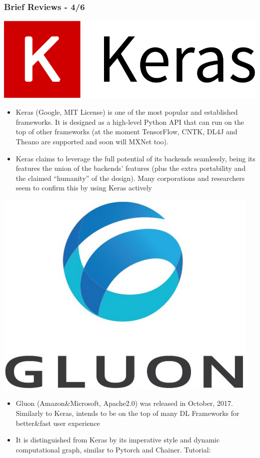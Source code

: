 \documentclass[hyperref={pdfpagelabels=false}]{beamer}
\begin{document}
    
     \begin{frame}
       \frametitle{Brief Reviews - 4/6}
       \centering
       \includegraphics[scale=0.07]{logo_keras.png}
       \begin{itemize}[<.->]
       \item \small{Keras (Google, MIT License) is one of the most popular and established frameworks. It is designed as a high-level Python API that can run on the top of other frameworks (at the moment TensorFlow, CNTK, DL4J and Theano are supported and soon will MXNet too\cite{keras-web})}.
       \item \small{Keras claims to leverage the full potential of its backends seamlessly, being its features the union of the backends' features (plus the extra portability and the claimed ``humanity'' of the design). Many corporations and researchers seem to confirm this by using Keras actively}
       \end{itemize}

       \vspace{0mm}
       \centering
       \includegraphics[scale=0.07]{logo_gluon.png}
       \begin{itemize}[<.->]
       \item \small{Gluon (Amazon\&Microsoft, Apache2.0) was released in October, 2017. Similarly to Keras, intends to be on the top of many DL Frameworks for better\&fast user experience}
       \item \small{It is distinguished from Keras by its imperative\cite{mxnet-web} style and dynamic computational graph, similar to Pytorch and Chainer\cite{dl4j-review}. Tutorial: \cite{gluon-tutorial}}
       \end{itemize}
     \end{frame}
\end{document}
